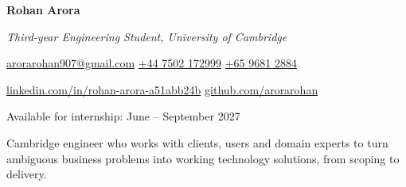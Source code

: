 \documentclass[11pt]{article}
\newcommand{\sep}{\quad\textbar\quad}
\begin{document}
\begin{center}
  {\Huge\bfseries Rohan Arora}\par
  \vspace{4pt}
  {\Large\itshape Third-year Engineering Student, University of Cambridge}\par
  \vspace{6pt}
  \href{mailto:arorarohan907@gmail.com}{arorarohan907@gmail.com}
  \sep
  \href{tel:+447502172999}{+44 7502 172999}
  \sep
  \href{tel:+6596812884}{+65 9681 2884}\par
  \vspace{2pt}
  \href{https://www.linkedin.com/in/rohan-arora-a51abb24b/}{linkedin.com/in/rohan-arora-a51abb24b}
  \sep \href{https://github.com/arorarohan}{github.com/arorarohan}\par
  \vspace{2pt}
  Available for internship: June -- September 2027
\end{center}

\vspace{6pt}

Cambridge engineer who works with clients, users and domain experts to turn ambiguous business problems into working technology solutions, from scoping to delivery.

\end{document}
